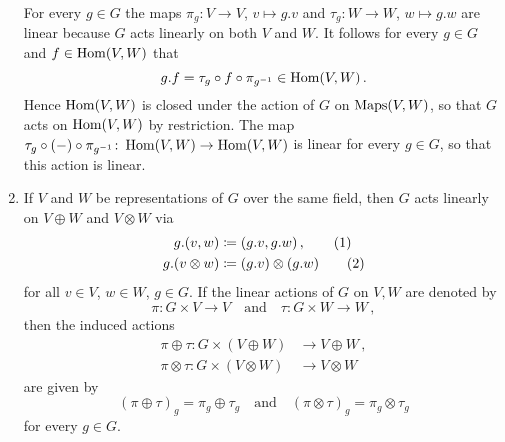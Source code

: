 \begin{example}
\begin{enumerate}[label=\alph*)]
      For every $g \in G$ the maps $\pi_g \colon V \to V$, $v \mapsto g.v$ and $\tau_g \colon W \to W$, $w \mapsto g.w$ are linear because $G$ acts linearly on both $V$ and $W$.
      It follows for every $g \in G$ and $f \in \operatorname{Hom}(V,W)$ that
      \[
            g.f
        =   \tau_g \circ f \circ \pi_{g^{-1}}
        \in \operatorname{Hom}(V,W) \,.
      \]
      Hence $\operatorname{Hom}(V,W)$ is closed under the action of $G$ on $\operatorname{Maps}(V,W)$, so that $G$ acts on $\operatorname{Hom}(V,W)$ by restriction.
      The map $\tau_g \circ (-) \circ \pi_{g^{-1}} \colon \operatorname{Hom}(V,W) \to \operatorname{Hom}(V,W)$ is linear for every $g \in G$, so that this action is linear.
    \item
      If $V$ and $W$ be representations of $G$ over the same field, then $G$ acts linearly on $V \oplus W$ and $V \otimes W$ via
      \begin{align*}
                  g.(v,w)
        &\coloneqq (g.v,g.w) \,,       \tag{1}
        \\
                  g.(v \otimes w)
        &\coloneqq (g.v) \otimes (g.w) \tag{2}
      \end{align*}
      for all $v \in V$, $w \in W$, $g \in G$.
      If the linear actions of $G$ on $V, W$ are denoted by
      \[
        \pi \colon G \times V \to V
        \quad\text{and}\quad
        \tau \colon G \times W \to W \,,
      \]
      then the induced actions
      \begin{align*}
        \pi \oplus \tau  \colon G \times (V \oplus W)  &\to V \oplus W  \,,
        \\
        \pi \otimes \tau \colon G \times (V \otimes W) &\to V \otimes W
      \end{align*}
      are given by
      \[
          (\pi \oplus \tau)_g
        = \pi_g \oplus \tau_g
        \quad\text{and}\quad
          (\pi \otimes \tau)_g
        = \pi_g \otimes \tau_g
      \]
      for every $g \in G$.
%       
%       

\end{enumerate}
\end{example}
